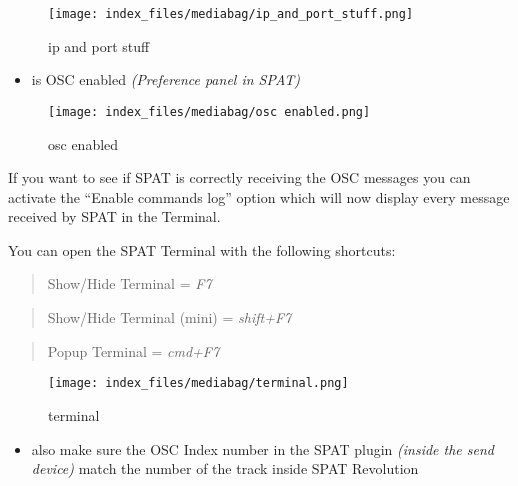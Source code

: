 \documentclass[
  letterpaper,
  DIV=11,
  numbers=noendperiod]{scrreport}
\providecommand{\tightlist}{%
  \setlength{\itemsep}{0pt}\setlength{\parskip}{0pt}}\usepackage{longtable,booktabs,array}
\begin{document}
\begin{figure}

{\centering \texttt{[image: index\_files/mediabag/ip\_and\_port\_stuff.png]}

}

\caption{ip and port stuff}

\end{figure}

\begin{itemize}
\tightlist
\item
  is OSC enabled \emph{(Preference panel in SPAT)}
\end{itemize}

\begin{figure}

{\centering \texttt{[image: index\_files/mediabag/osc enabled.png]}

}

\caption{osc enabled}

\end{figure}

If you want to see if SPAT is correctly receiving the OSC messages you
can activate the ``Enable commands log'' option which will now display
every message received by SPAT in the Terminal.

You can open the SPAT Terminal with the following shortcuts:

\begin{quote}
Show/Hide Terminal = \emph{F7}
\end{quote}

\begin{quote}
Show/Hide Terminal (mini) = \emph{shift+F7}
\end{quote}

\begin{quote}
Popup Terminal = \emph{cmd+F7}
\end{quote}

\begin{figure}

{\centering \texttt{[image: index\_files/mediabag/terminal.png]}

}

\caption{terminal}

\end{figure}

\begin{itemize}
\tightlist
\item
  also make sure the OSC Index number in the SPAT plugin \emph{(inside
  the send device)} match the number of the track inside SPAT Revolution
\end{itemize}
\end{document}
